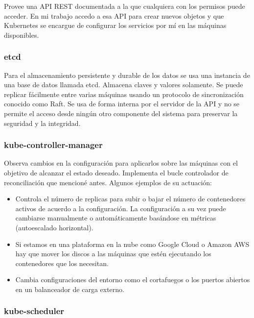 Provee una API REST documentada\cite{k8sapi} a la que cualquiera con los permisos puede acceder. En mi trabajo accedo a esa API para crear nuevos objetos y que Kubernetes se encargue de configurar los servicios por mí en las máquinas disponibles.

\subsubsection{etcd}
\label{subsubsec:k8s-etcd}

Para el almacenamiento persistente y durable de los datos se usa una instancia de una base de datos llamada etcd. Almacena claves y valores \cite{etcd} solamente. Se puede replicar fácilmente entre varias máquinas usando un protocolo de sincronización conocido como Raft\cite{raft2013}. Se usa de forma interna por el servidor de la API y no se permite el acceso desde ningún otro componente del sistema para preservar la seguridad y la integridad.

\subsubsection{kube-controller-manager}
\label{subsubsec:k8s-controller-manager}

Observa cambios en la configuración para aplicarlos sobre las máquinas con el objetivo de alcanzar el estado deseado. Implementa el bucle controlador de reconciliación que mencioné antes. Algunos ejemplos de su actuación:
\begin{itemize}
  \item Controla el número de replicas para subir o bajar el número de contenedores activos de acuerdo a la configuración. La configuración a su vez puede cambiarse manualmente o automáticamente basándose en métricas (autoescalado horizontal).
  \item Si estamos en una plataforma en la nube como Google Cloud o Amazon AWS hay que mover los discos a las máquinas que estén ejecutando los contenedores que los necesitan.
  \item Cambia configuraciones del entorno como el cortafuegos o los puertos abiertos en un balanceador de carga externo.
\end{itemize}

\subsubsection{kube-scheduler}
\label{subsubsec:k8s-scheduler}

